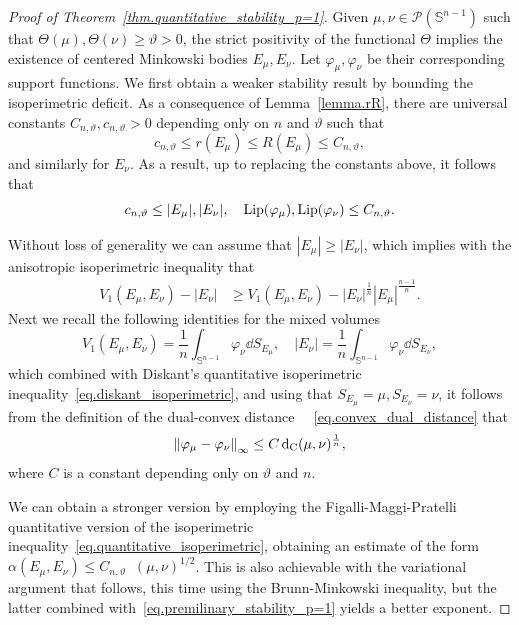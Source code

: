 \documentclass[a4paper, 10pt, twoside]{amsart}
\numberwithin{equation}{section}
\theoremstyle{plain}
\theoremstyle{definition}
\DeclareMathOperator{\dc}{\mathrm{d}_\mathrm{C}}
\begin{document}
\begin{proof}[Proof of Theorem~\ref{thm.quantitative_stability_p=1}]
    Given $\mu,\nu \in \mathscr{P}(\mathbb{S}^{n-1})$ such that $\Theta(\mu),\Theta(\nu) \ge \vartheta > 0$, the strict positivity of the functional $\Theta$ implies the existence of centered Minkowski bodies $E_\mu,E_\nu$. Let $\varphi_\mu, \varphi_\nu$ be their corresponding support functions. We first obtain a weaker stability result by bounding the isoperimetric deficit. As a consequence of Lemma~\ref{lemma.rR}, there are universal constants $C_{n,\vartheta},c_{n,\vartheta}>0$ depending only on $n$ and $\vartheta$ such that
    \[
        c_{n,\vartheta} \le r(E_\mu) \le R(E_\mu) \le C_{n,\vartheta},
    \]
    and similarly for $E_\nu$. As a result, up to replacing the constants above, it follows that 
    \[
        c_{n,\vartheta} \le |E_\mu|,|E_\nu|, \quad 
        \mathop{\rm Lip}(\varphi_{\mu}), \mathop{\rm Lip}(\varphi_{\nu}) \le C_{n,\vartheta}. 
    \]

    Without loss of generality we can assume that $|E_\mu| \ge |E_\nu|$, which implies with the anisotropic isoperimetric inequality that 
    \begin{align*}
        V_1(E_\mu,E_\nu) - |E_\nu|
        &\ge 
        V_1(E_\mu,E_\nu) - |E_\nu|^{\frac{1}{n}}|E_\mu|^{\frac{n-1}{n}}. %
    \end{align*}
    Next we recall the following identities for the mixed volumes
    \[  
        V_1(E_\mu,E_\nu) = \frac{1}{n}\int_{\mathbb{S}^{n-1}} \varphi_{\nu}\dd S_{E_\mu},
        \quad
        |E_\nu| = \frac{1}{n}\int_{\mathbb{S}^{n-1}} \varphi_{\nu}\dd S_{E_\nu},
    \]
    which combined with Diskant's quantitative isoperimetric inequality~\eqref{eq.diskant_isoperimetric}, and using that $S_{E_\mu}=\mu,S_{E_\nu}=\nu$, it follows from the definition of the dual-convex distance $\dc$~\eqref{eq.convex_dual_distance} that
    \begin{equation}\label{eq.premilinary_stability_p=1}
        \norm{\varphi_\mu - \varphi_\nu}_\infty \le C \dc(\mu,\nu)^{\frac{1}{n}},
    \end{equation}
    where $C$ is a constant depending only on $\vartheta$ and $n$. 

    We can obtain a stronger version by employing the Figalli-Maggi-Pratelli quantitative version of the isoperimetric inequality~\eqref{eq.quantitative_isoperimetric}, obtaining an estimate of the form $\alpha(E_\mu,E_\nu) \le C_{n,\vartheta} \dc(\mu,\nu)^{1/2}$. This is also achievable with the variational argument that follows, this time using the Brunn-Minkowski inequality, but the latter combined with~\eqref{eq.premilinary_stability_p=1} yields a better exponent. 


\end{proof}
\end{document}
